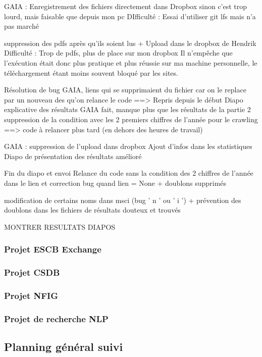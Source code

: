 GAIA : Enregistrement des fichiers directement dans Dropbox sinon c’est trop lourd, mais faisable que depuis mon pc
DIfficulté : Essai d’utiliser git lfs mais n’a pas marché

suppression des pdfs après qu’ils soient lus + Upload dans le dropbox de Hendrik
Difficulté : Trop de pdfs, plus de place sur mon dropbox
Il n'empêche que l'exécution était donc plus pratique et plus réussie sur ma machine personnelle, le téléchargement étant moins souvent bloqué par les sites.

Résolution de bug GAIA, liens qui se supprimaient du fichier car on le replace par un nouveau des qu’on relance le code ==> Repris depuis le début
Diapo explicative des résultats GAIA fait, manque plus que les résultats de la partie 2
suppression de la condition avec les 2 premiers chiffres de l’année pour le crawling ==> code à relancer plus tard (en dehors des heures de travail)

GAIA : suppression de l’upload dans dropbox
Ajout d’infos dans les statistiques
Diapo de présentation des résultats amélioré

Fin du diapo et envoi
Relance du code sans la condition des 2 chiffres de l’année dans le lien et correction bug quand lien = None + doublons supprimés

modification de certains noms dans msci (bug ' n ' ou ' i ') + prévention des doublons dans les fichiers de résultats douteux et trouvés

MONTRER RESULTATS DIAPOS


\subsubsection{Projet ESCB Exchange}

\subsubsection{Projet CSDB}

\subsubsection{Projet NFIG}

\subsubsection{Projet de recherche NLP}

\subsection{Planning général suivi}